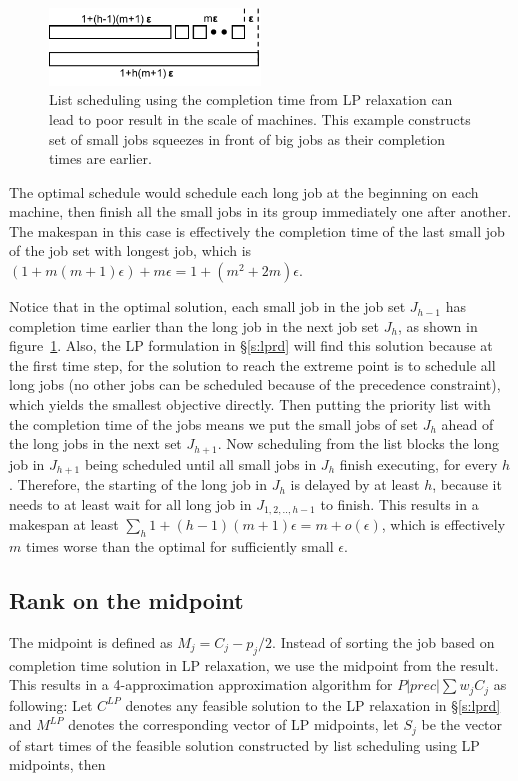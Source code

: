 \begin{figure}[h]
\centering
\includegraphics[width=0.5\textwidth]{figs/lpc.pdf}
\caption{List scheduling using the completion time from LP relaxation can lead to poor result in the scale of machines. This example constructs set of small jobs squeezes in front of big jobs as their completion times are earlier.}
\label{fig:lpc}
\end{figure}

The optimal schedule would schedule each long job at the beginning on each machine, then finish all the small jobs in its group immediately one after another. The makespan in this case is effectively the completion time of the last small job of the job set with longest job, which is $(1 + m(m+1)\epsilon) + m\epsilon = 1 +(m^2+2m)\epsilon$. 

Notice that in the optimal solution, each small job in the job set $J_{h-1}$ has completion time earlier than the long job in the next job set $J_h$, as shown in figure~\ref{fig:lpc}. Also, the LP formulation in \S\ref{s:lprd} will find this solution because at the first time step, for the solution to reach the extreme point is to schedule all long jobs (no other jobs can be scheduled because of the precedence constraint), which yields the smallest objective directly. Then putting the priority list with the completion time of the jobs means we put the small jobs of set $J_h$ ahead of the long jobs in the next set $J_{h+1}$. Now scheduling from the list blocks the long job in $J_{h+1}$ being scheduled until all small jobs in $J_h$ finish executing, for every $h$. Therefore, the starting of the long job in $J_h$ is delayed by at least $h$, because it needs to at least wait for all long job in $J_{1, 2,.., h-1}$ to finish. This results in a makespan at least $\sum_h 1 + (h-1)(m+1)\epsilon = m + o(\epsilon)$, which is effectively $m$ times worse than the optimal for sufficiently small $\epsilon$.

\subsection{Rank on the midpoint} \label{s:lpm}
The midpoint is defined as $M_j = C_j - p_j/2$. Instead of sorting the job based on completion time solution in LP relaxation, we use the midpoint from the result. This results in a 4-approximation approximation algorithm for $P|prec|\sum w_jC_j$ as following: Let $C^{LP}$ denotes any feasible solution to the LP relaxation in \S\ref{s:lprd} and $M^{LP}$ denotes the corresponding vector of LP midpoints, let $S_j$ be the vector of start times of the feasible solution constructed by list scheduling using LP midpoints, then

